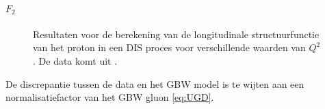 \documentclass[a4paper,11pt]{article}
\numberwithin{equation}{section} %
\begin{document}
      \paragraph{$F_2$}
\begin{figure} [H]
\centering
{}
\caption{Resultaten voor de berekening van de longitudinale structuurfunctie van het proton in een DIS proces voor verschillende waarden van $Q^2$. De data komt uit \cite{ZEUS}.}
\label{fig:ResF2}
\end{figure}
De discrepantie tussen de data en het GBW model is te wijten aan een normalisatiefactor van het GBW gluon \eqref{eq:UGD}.
\end{document}
